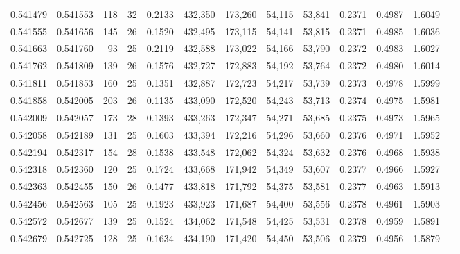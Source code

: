 \begin{tabular}{rrrrrrrrrrrrr}
0.541479 & 0.541553 & 118 &  32 &                                     0.2133 & 432,350 & 173,260 &  54,115 &  53,841 & 0.2371 & 0.4987 & 1.6049 \\
0.541555 & 0.541656 & 145 &  26 &                                     0.1520 & 432,495 & 173,115 &  54,141 &  53,815 & 0.2371 & 0.4985 & 1.6036 \\
0.541663 & 0.541760 &  93 &  25 &                                     0.2119 & 432,588 & 173,022 &  54,166 &  53,790 & 0.2372 & 0.4983 & 1.6027 \\
0.541762 & 0.541809 & 139 &  26 &                                     0.1576 & 432,727 & 172,883 &  54,192 &  53,764 & 0.2372 & 0.4980 & 1.6014 \\
0.541811 & 0.541853 & 160 &  25 &                                     0.1351 & 432,887 & 172,723 &  54,217 &  53,739 & 0.2373 & 0.4978 & 1.5999 \\
0.541858 & 0.542005 & 203 &  26 &                                     0.1135 & 433,090 & 172,520 &  54,243 &  53,713 & 0.2374 & 0.4975 & 1.5981 \\
0.542009 & 0.542057 & 173 &  28 &                                     0.1393 & 433,263 & 172,347 &  54,271 &  53,685 & 0.2375 & 0.4973 & 1.5965 \\
0.542058 & 0.542189 & 131 &  25 &                                     0.1603 & 433,394 & 172,216 &  54,296 &  53,660 & 0.2376 & 0.4971 & 1.5952 \\
0.542194 & 0.542317 & 154 &  28 &                                     0.1538 & 433,548 & 172,062 &  54,324 &  53,632 & 0.2376 & 0.4968 & 1.5938 \\
0.542318 & 0.542360 & 120 &  25 &                                     0.1724 & 433,668 & 171,942 &  54,349 &  53,607 & 0.2377 & 0.4966 & 1.5927 \\
0.542363 & 0.542455 & 150 &  26 &                                     0.1477 & 433,818 & 171,792 &  54,375 &  53,581 & 0.2377 & 0.4963 & 1.5913 \\
0.542456 & 0.542563 & 105 &  25 &                                     0.1923 & 433,923 & 171,687 &  54,400 &  53,556 & 0.2378 & 0.4961 & 1.5903 \\
0.542572 & 0.542677 & 139 &  25 &                                     0.1524 & 434,062 & 171,548 &  54,425 &  53,531 & 0.2378 & 0.4959 & 1.5891 \\
0.542679 & 0.542725 & 128 &  25 &                                     0.1634 & 434,190 & 171,420 &  54,450 &  53,506 & 0.2379 & 0.4956 & 1.5879 \\

\end{tabular}
